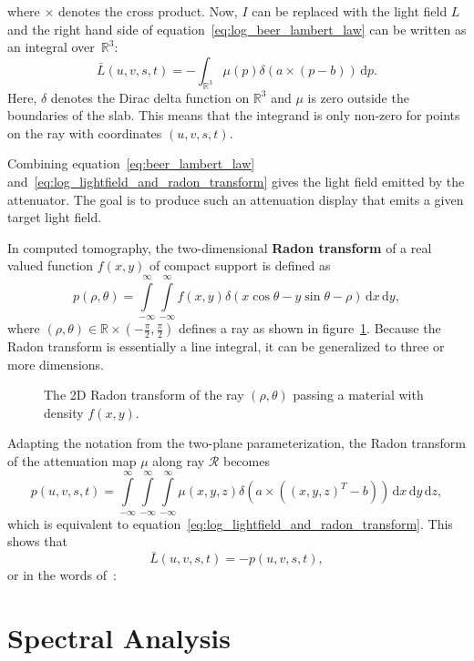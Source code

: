 where $\times$ denotes the cross product.
Now, $I$ can be replaced with the light field $L$ and the right hand side of equation~\ref{eq:log_beer_lambert_law} can be written as an integral over~$\mathbb{R}^3$:
\begin{equation}\label{eq:log_lightfield_and_radon_transform}
	\bar{L}(u, v, s, t) = 	%
							-\int_{\mathbb{R}^3}
								\mu(p) \delta ( a \times (p - b) ) \, 
							\mathrm{d}p.
\end{equation}
Here, $\delta$ denotes the Dirac delta function on $\mathbb{R}^3$ and $\mu$ is zero outside the boundaries of the slab. 
This means that the integrand is only non-zero for points on the ray with coordinates $(u, v, s, t)$.

Combining equation~\ref{eq:beer_lambert_law} and~\ref{eq:log_lightfield_and_radon_transform} gives the light field emitted by the attenuator.
The goal is to produce such an attenuation display that emits a given target light field.

In computed tomography, the two-dimensional \textbf{Radon transform} of a real valued function $f(x, y)$ of compact support is defined as
\begin{equation}
	p(\rho, \theta) = 	\int \limits_{-\infty}^{\infty} 
						\int \limits_{-\infty}^{\infty}
							f(x, y) \delta (x \cos \theta - y \sin \theta - \rho) \, 
						\mathrm{d}x \,
						\mathrm{d}y,
\end{equation}
where $(\rho, \theta) \in \mathbb{R} \times \left(- \frac{\pi}{2}, \frac{\pi}{2}\right)$ defines a ray as shown in figure~\ref{fig:radon_transform_2D_sketch}.
Because the Radon transform is essentially a line integral, it can be generalized to three or more dimensions.
\begin{figure}[tb]
	\centering
	
	\caption{The 2D Radon transform of the ray $(\rho, \theta)$ passing a material with density $f(x, y)$.}
	\label{fig:radon_transform_2D_sketch}
\end{figure}
Adapting the notation from the two-plane parameterization, the Radon transform of the attenuation map $\mu$ along ray $\mathcal{R}$ becomes
\begin{equation}
	p(u, v, s, t) = 	\int \limits_{-\infty}^{\infty} 
						\int \limits_{-\infty}^{\infty}
						\int \limits_{-\infty}^{\infty}
							\mu(x, y, z) \delta \left(a \times \left((x, y, z)^T - b\right) \right) \, 
						\mathrm{d}x \,
						\mathrm{d}y \,
						\mathrm{d}z, 
\end{equation}
which is equivalent to equation~\ref{eq:log_lightfield_and_radon_transform}.
This shows that
\begin{equation}
	\bar{L}(u, v, s, t) = -p(u, v, s, t), 
\end{equation}
or in the words of~\cite{WetzsteinTomo}: 


\section{Spectral Analysis}
